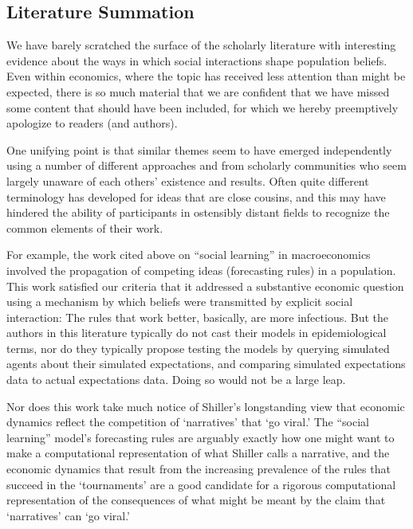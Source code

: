 \subsection{Literature Summation}

We have barely scratched the surface of the scholarly literature with interesting evidence about the ways in which social interactions shape population beliefs.  Even within economics, where the topic has received less attention than might be expected, there is so much material that we are confident that we have missed some content that should have been included, for which we hereby preemptively apologize to readers (and authors).%

One unifying point is that similar themes seem to have emerged independently using a number of different approaches and from scholarly communities who seem largely unaware of each others' existence and results.  Often quite different terminology has developed for ideas that are close cousins, and this may have hindered the ability of participants in ostensibly distant fields to recognize the common elements of their work.

For example, the work cited above on ``social learning'' in macroeconomics involved the propagation of competing ideas (forecasting rules) in a population.  This work satisfied our criteria that it addressed a substantive economic question using a mechanism by which beliefs were transmitted by explicit social interaction: The rules that work better, basically, are more infectious.  But the authors in this literature typically do not cast their models in epidemiological terms, nor do they typically propose testing the models by querying simulated agents about their simulated expectations, and comparing simulated expectations data to actual expectations data.  Doing so would not be a large leap.

Nor does this work take much notice of Shiller's longstanding view that economic dynamics reflect the competition of `narratives' that `go viral.'  The ``social learning'' model's  forecasting rules are arguably exactly how one might want to make a computational representation of what Shiller calls a narrative, and the economic dynamics that result from the increasing prevalence of the rules that succeed in the `tournaments' are a good candidate for a rigorous computational representation of the consequences of what might be meant by the claim that `narratives' can `go viral.'

